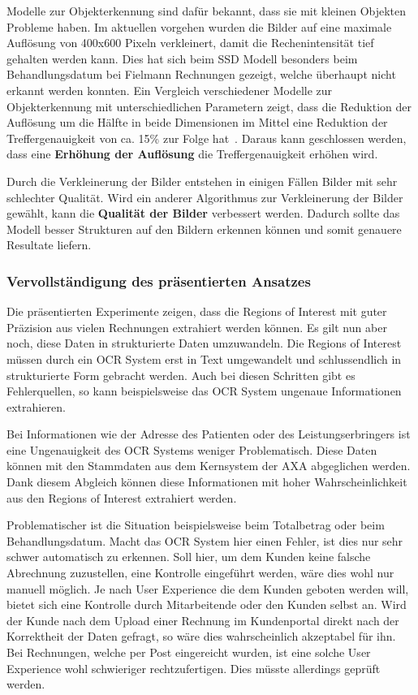Modelle zur Objekterkennung sind dafür bekannt, dass sie mit kleinen Objekten Probleme haben. Im aktuellen vorgehen wurden die Bilder auf eine maximale Auflösung von 400x600 Pixeln verkleinert, damit die Rechenintensität tief gehalten werden kann. Dies hat sich beim SSD Modell besonders beim Behandlungsdatum bei Fielmann Rechnungen gezeigt, welche überhaupt nicht erkannt werden konnten. Ein Vergleich verschiedener Modelle zur Objekterkennung mit unterschiedlichen Parametern zeigt, dass die Reduktion der Auflösung um die Hälfte in beide Dimensionen im Mittel eine Reduktion der Treffergenauigkeit von ca. 15\% zur Folge hat~\autocite{SSDFRCNN}. Daraus kann geschlossen werden, dass eine \textbf{Erhöhung der Auflösung} die Treffergenauigkeit erhöhen wird.

Durch die Verkleinerung der Bilder entstehen in einigen Fällen Bilder mit sehr schlechter Qualität. Wird ein anderer Algorithmus zur Verkleinerung der Bilder gewählt, kann die \textbf{Qualität der Bilder} verbessert werden. Dadurch sollte das Modell besser Strukturen auf den Bildern erkennen können und somit genauere Resultate liefern.

\subsubsection{Vervollständigung des präsentierten Ansatzes}
\label{chap:ie-quality-check}

Die präsentierten Experimente zeigen, dass die Regions of Interest mit guter Präzision aus vielen Rechnungen extrahiert werden können. Es gilt nun aber noch, diese Daten in strukturierte Daten umzuwandeln. Die Regions of Interest müssen durch ein OCR System erst in Text umgewandelt und schlussendlich in strukturierte Form gebracht werden. Auch bei diesen Schritten gibt es Fehlerquellen, so kann beispielsweise das OCR System ungenaue Informationen extrahieren.

Bei Informationen wie der Adresse des Patienten oder des Leistungserbringers ist eine Ungenauigkeit des OCR Systems weniger Problematisch. Diese Daten können mit den Stammdaten aus dem Kernsystem der AXA abgeglichen werden. Dank diesem Abgleich können diese Informationen mit hoher Wahrscheinlichkeit aus den Regions of Interest extrahiert werden.

Problematischer ist die Situation beispielsweise beim Totalbetrag oder beim Behandlungsdatum. Macht das OCR System hier einen Fehler, ist dies nur sehr schwer automatisch zu erkennen. Soll hier, um dem Kunden keine falsche Abrechnung zuzustellen, eine Kontrolle eingeführt  werden, wäre dies wohl nur manuell möglich. Je nach User Experience die dem Kunden geboten werden will, bietet sich eine Kontrolle durch Mitarbeitende oder den Kunden selbst an. Wird der Kunde nach dem Upload einer Rechnung im Kundenportal direkt nach der Korrektheit der Daten gefragt, so wäre dies wahrscheinlich akzeptabel für ihn. Bei Rechnungen, welche per Post eingereicht wurden, ist eine solche User Experience wohl schwieriger rechtzufertigen. Dies müsste allerdings geprüft werden.




